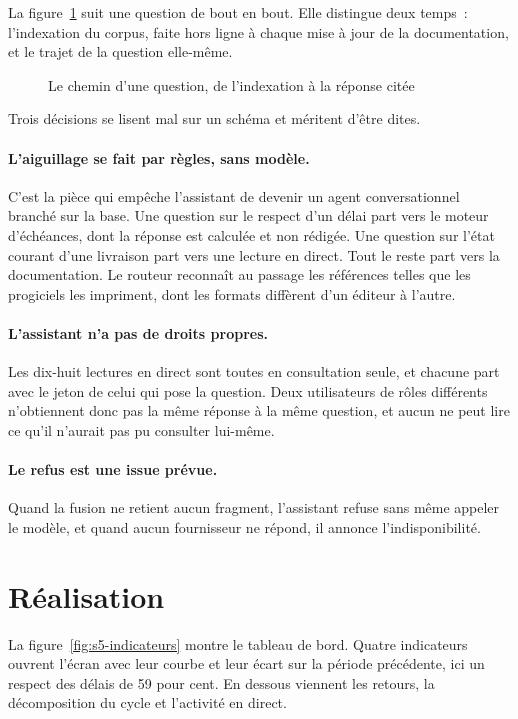 La figure~\ref{fig:rag-pipeline} suit une question de bout en bout. Elle distingue deux temps~:
l'indexation du corpus, faite hors ligne à chaque mise à jour de la documentation, et le trajet de la
question elle-même.

\begin{figure}[H]
\centering
{}
\caption{Le chemin d'une question, de l'indexation à la réponse citée}
\label{fig:rag-pipeline}
\end{figure}

Trois décisions se lisent mal sur un schéma et méritent d'être dites.

\paragraph{L'aiguillage se fait par règles, sans modèle.} C'est la pièce qui empêche l'assistant de
devenir un agent conversationnel branché sur la base. Une question sur le respect d'un délai part
vers le moteur d'échéances, dont la réponse est calculée et non rédigée. Une question sur l'état
courant d'une livraison part vers une lecture en direct. Tout le reste part vers la documentation.
Le routeur reconnaît au passage les références telles que les progiciels les impriment, dont les
formats diffèrent d'un éditeur à l'autre.

\paragraph{L'assistant n'a pas de droits propres.} Les dix-huit lectures en direct sont toutes en
consultation seule, et chacune part avec le jeton de celui qui pose la question. Deux utilisateurs de
rôles différents n'obtiennent donc pas la même réponse à la même question, et aucun ne peut lire ce
qu'il n'aurait pas pu consulter lui-même.

\paragraph{Le refus est une issue prévue.} Quand la fusion ne retient aucun fragment, l'assistant
refuse sans même appeler le modèle, et quand aucun fournisseur ne répond, il annonce
l'indisponibilité.

\section{Réalisation}

La figure~\ref{fig:s5-indicateurs} montre le tableau de bord. Quatre indicateurs ouvrent l'écran avec
leur courbe et leur écart sur la période précédente, ici un respect des délais de 59 pour cent. En
dessous viennent les retours, la décomposition du cycle et l'activité en direct.

